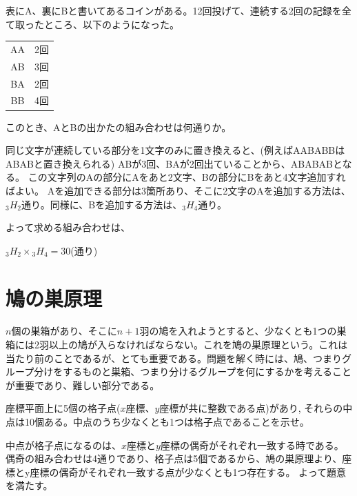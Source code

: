 \documentclass[uplatex,dvipdfmx]{jsbook}
\begin{document}
\begin{problem}[練習問題3]
    表にA、裏にBと書いてあるコインがある。12回投げて、連続する2回の記録を全て取ったところ、以下のようになった。

    \begin{tabular}{cc}
        AA & 2回\\
        AB & 3回\\
        BA & 2回\\
        BB & 4回\\
    \end{tabular}

    このとき、AとBの出かたの組み合わせは何通りか。
\end{problem}

\begin{answer}
    同じ文字が連続している部分を1文字のみに置き換えると、(例えばAABABBはABABと置き換えられる)
    ABが3回、BAが2回出ていることから、ABABABとなる。
    この文字列のAの部分にAをあと2文字、Bの部分にBをあと4文字追加すればよい。
    Aを追加できる部分は3箇所あり、そこに2文字のAを追加する方法は、${}_3{H}_2$通り。同様に、Bを追加する方法は、${}_3{H}_4$通り。

    よって求める組み合わせは、

    ${}_3{H}_2 \times {}_3{H}_4=30$(通り)
\end{answer}

\section{鳩の巣原理}
$n$個の巣箱があり、そこに$n+1$羽の鳩を入れようとすると、少なくとも1つの巣箱には2羽以上の鳩が入らなければならない。これを鳩の巣原理という。これは当たり前のことであるが、とても重要である。問題を解く時には、鳩、つまりグループ分けをするものと巣箱、つまり分けるグループを何にするかを考えることが重要であり、難しい部分である。

\begin{problem}[練習問題1]
    座標平面上に5個の格子点($x$座標、$y$座標が共に整数である点)があり,
    それらの中点は10個ある。中点のうち少なくとも1つは格子点であることを示せ。
\end{problem}

\begin{answer}
    中点が格子点になるのは、$x$座標と$y$座標の偶奇がそれぞれ一致する時である。
    偶奇の組み合わせは4通りであり、格子点は5個であるから、鳩の巣原理より、座標とy座標の偶奇がそれぞれ一致する点が少なくとも1つ存在する。
    よって題意を満たす。
\end{answer}
\end{document}
